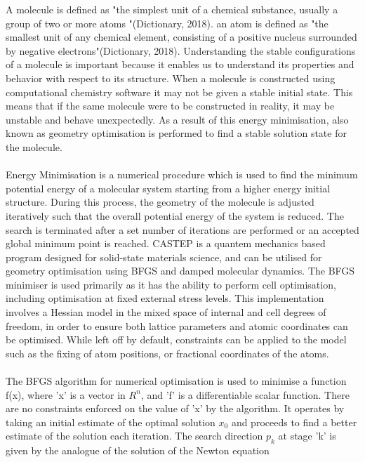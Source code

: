 \documentclass[9pt]{article}
\begin{document}
A molecule is defined as "the simplest unit of a chemical substance, usually a group of two or more atoms "(Dictionary, 2018). an atom is defined as "the smallest unit of any chemical element, consisting of a positive nucleus surrounded by negative electrons"(Dictionary, 2018). Understanding the stable configurations of a molecule is important because it enables us to understand its properties and behavior with respect to its structure. When a molecule is constructed using computational chemistry software it may not be given a stable initial state. This means that if the same molecule were to be constructed in reality, it may be unstable and behave unexpectedly. As a result of this energy minimisation, also known as geometry optimisation is performed to find a stable solution state for the molecule.
\\
\\
Energy Minimisation is a numerical procedure which is used to find the minimum potential energy of a molecular system starting from a higher energy initial structure. During this process, the geometry of the molecule is adjusted iteratively such that the overall potential energy of the system is reduced. The search is terminated after a set number of iterations are performed or an accepted global minimum point is reached. CASTEP is a quantem mechanics based program designed for solid-state materials science, and can be utilised for geometry optimisation using BFGS and damped molecular dynamics. The BFGS minimiser is used primarily as it has the ability to perform cell optimisation, including optimisation at fixed external stress levels. This implementation involves a Hessian model in the mixed space of internal and cell degrees of freedom, in order to ensure both lattice parameters and atomic coordinates can be optimised. While left off by default, constraints can be applied to the model such as the fixing of atom positions, or fractional coordinates of the atoms.
\\
\\
The BFGS algorithm for numerical optimisation is used to minimise a function f(x), where 'x' is a vector in $R^{n}$, and 'f' is a differentiable scalar function. There are no constraints enforced on the value of 'x' by the algorithm. It operates by taking an initial estimate of the optimal solution $x_{0}$ and proceeds to find a better estimate of the solution each iteration. The search direction $p_{k}$ at stage 'k' is given by the analogue of the solution of the Newton equation
\\ 
\\
\end{document}

